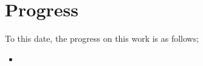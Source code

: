 \chapter{Progress}\label{ch:progress}

To this date, the progress on this work is as follows;

\begin{itemize}
    \item
\end{itemize}

